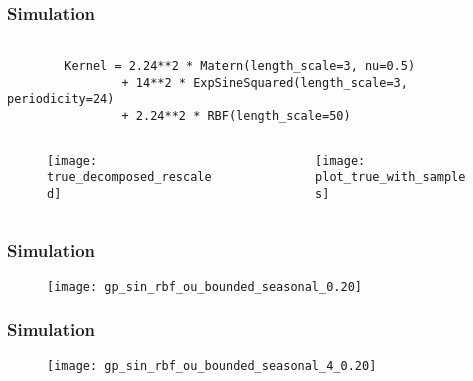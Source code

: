 \documentclass[
	8pt, %
]{beamer}
\begin{document}
\begin{frame}[fragile]
	\frametitle{Simulation}

	\begin{verbatim}

		Kernel = 2.24**2 * Matern(length_scale=3, nu=0.5)
				+ 14**2 * ExpSineSquared(length_scale=3, periodicity=24)
				+ 2.24**2 * RBF(length_scale=50)

	\end{verbatim}

		\begin{columns}[c] %
		\begin{column}{0.45\textwidth} %
				\begin{figure}
					\texttt{[image: true\_decomposed\_rescaled]}
				\end{figure}
		\end{column}
		\begin{column}{0.5\textwidth} %
				\begin{figure}
					\texttt{[image: plot\_true\_with\_samples]}
				\end{figure}

		\end{column}
	\end{columns}


\end{frame}

\begin{frame}
	\frametitle{Simulation}


	\begin{figure}
			\texttt{[image: gp\_sin\_rbf\_ou\_bounded\_seasonal\_0.20]}
	\end{figure}

\end{frame}



\begin{frame}
	\frametitle{Simulation}

	\begin{figure}
			\texttt{[image: gp\_sin\_rbf\_ou\_bounded\_seasonal\_4\_0.20]}
	\end{figure}

\end{frame}
\end{document}
